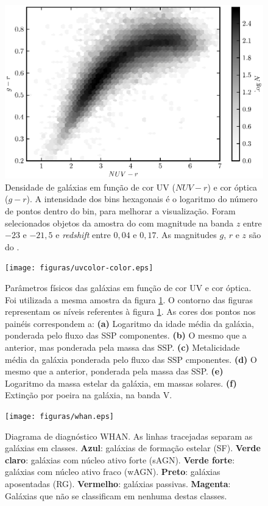 \begin{figure}
	\includegraphics{figuras/uvcolor-color-density.eps}
	\caption[Densidade de galáxias no diagrama cor--cor UV.]
	{Densidade de galáxias em função de cor UV ($NUV-r$) e cor óptica ($g-r$). A
	intensidade dos bins hexagonais é o logaritmo do número de pontos dentro do
	bin, para melhorar a visualização. Foram selecionados objetos da amostra do
	\starlight com magnitude na banda $z$ entre $-23$ e $-21,5$ e {\em redshift}
	entre $0,04$ e $0,17$. As magnitudes $g$, $r$ e $z$ são do \SDSS.}
	\label{fig:DensityColor}
\end{figure}

\begin{figure}
	\texttt{[image: figuras/uvcolor-color.eps]}
	\caption[Diagrama cor--cor UV para os diversos parâmetros \starlight.]
	{Parâmetros físicos das galáxias em função de cor UV e cor óptica. Foi
	utilizada a mesma amostra da figura \ref{fig:DensityColor}. O contorno
	das figuras representam os níveis referentes à figura \ref{fig:DensityColor}.
	As cores dos pontos nos painéis correspondem a: {\bf (a)} Logaritmo da idade
	média da galáxia, ponderada pelo fluxo das SSP componentes. {\bf (b)} O mesmo
	que a anterior, mas ponderada pela massa das SSP. {\bf (c)} Metalicidade média
	da galáxia ponderada pelo fluxo das SSP cmponentes. {\bf (d)} O mesmo que a
	anterior, ponderada pela massa das SSP. {\bf (e)} Logaritmo da massa estelar da
	galáxia, em massas solares. {\bf (f)} Extinção por poeira na galáxia, na banda
	V.}
	\label{fig:ColorStarlightParam}
\end{figure}

\begin{figure}
	\texttt{[image: figuras/whan.eps]}
	\caption[Diagrama de diagnóstico WHAN.]
	{Diagrama de diagnóstico WHAN. As linhas tracejadas separam as galáxias
	em classes. {\bf Azul}: galáxias de formação estelar (SF). {\bf Verde
	claro}: galáxias com núcleo ativo forte (sAGN). {\bf Verde forte}:
	galáxias com núcleo ativo fraco (wAGN). {\bf Preto}: galáxias aposentadas
	(RG). {\bf Vermelho}: galáxias passivas. {\bf Magenta}: Galáxias que não se
	classificam em nenhuma destas classes.}
	\label{fig:Whan}
\end{figure}

